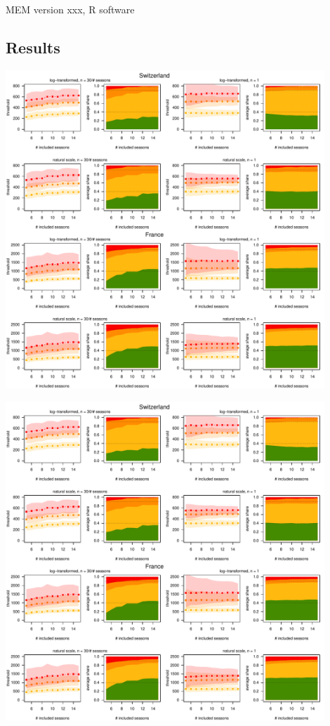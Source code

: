 \documentclass{article}
\begin{document}
MEM version xxx, R software

\subsection{Results}

\includegraphics[page=1, width=0.9\textwidth]{figure/plot_results.pdf}

\includegraphics[page=2, width=0.9\textwidth]{figure/plot_results.pdf}
\end{document}
